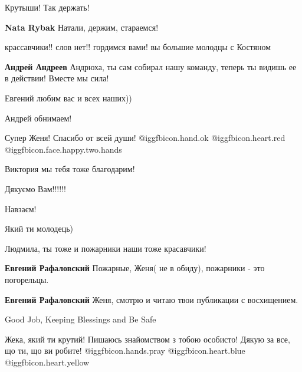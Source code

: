  
 
 
 
 
\zzSecCmt

\begin{itemize} %
Крутыши! Так держать!

\textbf{Nata Rybak} Натали, держим, стараемся!

крассавчики!! слов нет!! гордимся вами! вы большие молодцы с Костяном

\textbf{Андрей Андреев} Андрюха, ты сам собирал нашу команду, теперь ты видишь ее в действии! Вместе мы сила!

Евгений любим вас и всех наших))

Андрей обнимаем!

Супер Женя! Спасибо от всей души! @igg{fbicon.hand.ok} @igg{fbicon.heart.red} @igg{fbicon.face.happy.two.hands} 

Виктория мы тебя тоже благодарим!

Дякуємо Вам!!!!!!

Навзаєм!

Який ти молодець)

\begin{itemize} %
Людмила, ты тоже и пожарники наши тоже красавчики!

\textbf{Евгений Рафаловский} Пожарные, Женя( не в обиду), пожарники - это погорельцы.

\textbf{Евгений Рафаловский} Женя, смотрю и читаю твои публикации с восхищением.
\end{itemize} %

Good Job, Keeping Blessings and Be Safe


Жека, який ти крутий! Пишаюсь знайомством з тобою особисто! Дякую за все, що
ти, що ви робите!  @igg{fbicon.hands.pray}  @igg{fbicon.heart.blue}  @igg{fbicon.heart.yellow} 


\end{itemize}
